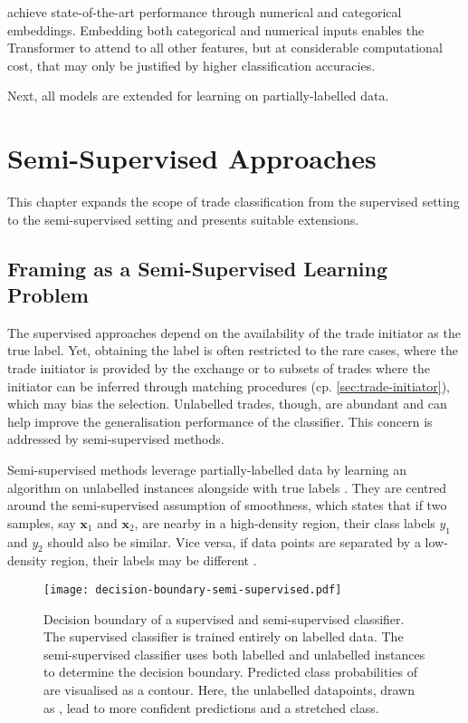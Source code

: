 \textcite[][8]{gorishniyRevisitingDeepLearning2021} achieve state-of-the-art performance through numerical and categorical embeddings. Embedding both categorical and numerical inputs enables the Transformer to attend to all other features, but at considerable computational cost, that may only be justified by higher classification accuracies.

Next, all models are extended for learning on partially-labelled data.

\newpage
\section{Semi-Supervised Approaches}\label{sec:semi-supervised-approaches}

This chapter expands the scope of trade classification from the supervised setting to the semi-supervised setting and presents suitable extensions.

\subsection{Framing as a Semi-Supervised Learning Problem}\label{sec:problem-framing-2}

The supervised approaches depend on the availability of the trade initiator as the true label. Yet, obtaining the label is often restricted to the rare cases, where the trade initiator is provided by the exchange or to subsets of trades where the initiator can be inferred through matching procedures (cp. \cref{sec:trade-initiator}), which may bias the selection. Unlabelled trades, though, are abundant and can help improve the generalisation performance of the classifier. This concern is addressed by semi-supervised methods.

Semi-supervised methods leverage partially-labelled data by learning an algorithm on unlabelled instances alongside with true labels \autocite[][6]{chapelleSemisupervisedLearning2006}. They are centred around the semi-supervised assumption of smoothness, which states that if two samples, say $\mathbf{x}_{1}$ and $\mathbf{x}_{2}$, are nearby in a high-density region, their class labels $y_{1}$ and $y_{2}$ should also be similar. Vice versa, if data points are separated by a low-density region, their labels may be different \autocite[][5]{chapelleSemisupervisedLearning2006}.

\begin{figure}[ht]
    \centering
    \texttt{[image: decision-boundary-semi-supervised.pdf]}
    \caption[Decision Boundary of a Supervised and Semi-Supervised Classifier]{Decision boundary of a supervised and semi-supervised classifier. The supervised classifier is trained entirely on labelled data. The semi-supervised classifier uses both labelled and unlabelled instances to determine the decision boundary. Predicted class probabilities of  are visualised as a contour. Here, the unlabelled datapoints, drawn as , lead to more confident predictions and a stretched class.}
    \label{fig:supervised-semi-supervised}
\end{figure}

